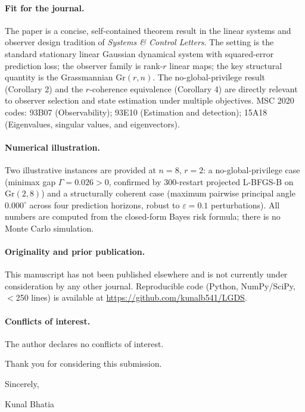 \documentclass[12pt]{article}
\begin{document}
\paragraph{Fit for the journal.}
The paper is a concise, self-contained theorem result in the linear systems
and observer design tradition of \textit{Systems \& Control Letters}.
The setting is the standard stationary linear Gaussian dynamical system
with squared-error prediction loss; the observer family is rank-$r$ linear
maps; the key structural quantity is the Grassmannian $\mathrm{Gr}(r,n)$.
The no-global-privilege result (Corollary 2) and the $r$-coherence equivalence
(Corollary 4) are directly relevant to observer selection and state estimation
under multiple objectives.
MSC 2020 codes: 93B07 (Observability); 93E10 (Estimation and detection);
15A18 (Eigenvalues, singular values, and eigenvectors).

\paragraph{Numerical illustration.}
Two illustrative instances are provided at $n=8$, $r=2$: a
no-global-privilege case (minimax gap $\Gamma = 0.026 > 0$, confirmed by
300-restart projected L-BFGS-B on $\mathrm{Gr}(2,8)$) and a structurally
coherent case (maximum pairwise principal angle $0.000^\circ$ across four
prediction horizons, robust to $\varepsilon=0.1$ perturbations).
All numbers are computed from the closed-form Bayes risk formula; there is
no Monte Carlo simulation.

\paragraph{Originality and prior publication.}
This manuscript has not been published elsewhere and is not currently under
consideration by any other journal.
Reproducible code (Python, NumPy/SciPy, $<$250 lines) is available at
\url{https://github.com/kunalb541/LGDS}.

\paragraph{Conflicts of interest.}
The author declares no conflicts of interest.

\bigskip

\noindent Thank you for considering this submission.

\bigskip

\noindent Sincerely,

\bigskip\bigskip

\noindent Kunal Bhatia
\end{document}
